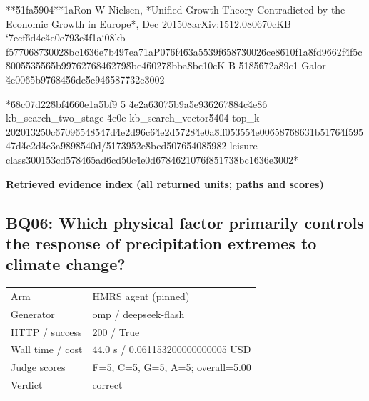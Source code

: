 \documentclass[10pt]{article}
\begin{document}
\begin{AnswerText}
**\u51fa\u5904**\uff1aRon W Nielsen, *Unified Growth Theory Contradicted by the Economic Growth in Europe*, Dec 2015\uff08arXiv:1512.08067\uff0cKB `\u7ecf\u6d4e\u4e0e\u793e\u4f1a`\uff08kb f5770687\u3002\u8bc1\u636e\u7b49\u7ea7\uff1aP0\u76f4\u63a5\u539f\u6587\u3002\u6ce8\u610f\uff1a\u8fd9\u662f\u4f5c\u8005\u5355\u65b9\u9762\u7684\u6279\u8bc4\u6027\u8bba\u8bc1\uff0cK B \u5185\u672a\u89c1 Galor \u4e00\u65b9\u7684\u56de\u5e94\u6587\u732e\u3002

*\u68c0\u7d22\u8bf4\u660e\uff1a\u5bf9 5 \u4e2a\u6307\u5b9a\u5e93\u6267\u884c\u4e86 kb_search_two_stage \u4e0e kb_search_vector\u5404 top_k 20\u201325\uff0c\u6709\u6548\u547d\u4e2d\u96c6\u4e2d\u5728\u4e0a\u8ff0\u5355\u4e00\u6587\u6863\uff1b\u5176\u4f59\u547d\u4e2d\u4e3a\u9898\u540d/\u5173\u952e\u8bcd\u5076\u5408\u5982 leisure class\u3001\u53cd\u5784\u65ad\u6cd5\uff0c\u4e0d\u6784\u6210\u76f8\u5173\u8bc1\u636e\u3002*
\end{AnswerText}

\textbf{Retrieved evidence index (all returned units; paths and scores) }
\begin{EvidenceText}
\end{EvidenceText}
\subsection{BQ06: Which physical factor primarily controls the response of precipitation extremes to climate change?}
\begin{tabular}{@{}ll@{}}
Arm & HMRS agent (pinned)\\
Generator & omp / deepseek-flash\\
HTTP / success & 200 / True\\
Wall time / cost & 44.0 s / 0.061153200000000005 USD\\
Judge scores & F=5, C=5, G=5, A=5; overall=5.00\\
Verdict & correct\\
\end{tabular}
\end{document}
